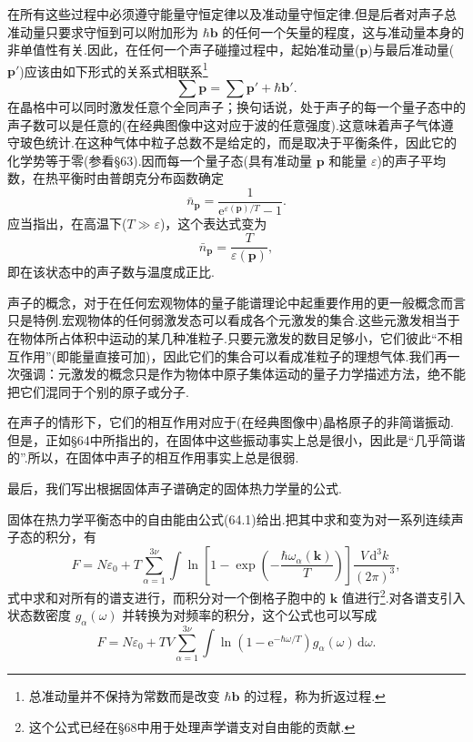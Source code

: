 在所有这些过程中必须遵守能量守恒定律以及准动量守恒定律.但是后者对声子总准动量只要求守恒到可以附加形为 $\hbar\boldsymbol{b}$ 的任何一个矢量的程度，这与准动量本身的非单值性有关.因此，在任何一个声子碰撞过程中，起始准动量($\boldsymbol{p}$)与最后准动量($\boldsymbol{p}'$)应该由如下形式的关系式相联系\footnote{总准动量并不保持为常数而是改变 $\hbar\boldsymbol{b}$ 的过程，称为折返过程.}
\begin{equation}
  \sum\boldsymbol{p}=\sum\boldsymbol{p}'+\hbar\boldsymbol{b}'.
\end{equation}
在晶格中可以同时激发任意个全同声子；换句话说，处于声子的每一个量子态中的声子数可以是任意的(在经典图像中这对应于波的任意强度).这意味着声子气体遵守玻色统计.在这种气体中粒子总数不是给定的，而是取决于平衡条件，因此它的化学势等于零(参看§63).因而每一个量子态(具有准动量 $\boldsymbol{p}$ 和能量 $\varepsilon$)的声子平均数，在热平衡时由普朗克分布函数确定
\begin{equation}
  \bar{n}_{\boldsymbol{p}}=\frac{1}{\mathrm{e}^{\varepsilon(\boldsymbol{p})/T}-1}.
\end{equation}
应当指出，在高温下($T\gg\varepsilon$)，这个表达式变为
\begin{equation}
  \bar{n}_{\boldsymbol{p}}=\frac{T}{\varepsilon(\boldsymbol{p})},
\end{equation}
即在该状态中的声子数与温度成正比.

声子的概念，对于在任何宏观物体的量子能谱理论中起重要作用的更一般概念而言只是特例.宏观物体的任何弱激发态可以看成各个元激发的集合.这些元激发相当于在物体所占体积中运动的某几种准粒子.只要元激发的数目足够小，它们彼此“不相互作用”(即能量直接可加)，因此它们的集合可以看成准粒子的理想气体.我们再一次强调：元激发的概念只是作为物体中原子集体运动的量子力学描述方法，绝不能把它们混同于个别的原子或分子.

在声子的情形下，它们的相互作用对应于(在经典图像中)晶格原子的非简谐振动.但是，正如§64中所指出的，在固体中这些振动事实上总是很小，因此是“几乎简谐的”.所以，在固体中声子的相互作用事实上总是很弱.

最后，我们写出根据固体声子谱确定的固体热力学量的公式.

固体在热力学平衡态中的自由能由公式(64.1)给出.把其中求和变为对一系列连续声子态的积分，有
\begin{equation}
  F=N\varepsilon_0+T\sum_{\alpha=1}^{3\nu}\int\ln\left[1-\exp\left(-\frac{\hbar\omega_\alpha(\boldsymbol{k})}{T}\right)\right]\frac{V\,\mathrm{d}^3k}{(2\pi)^3},
\end{equation}
式中求和对所有的谱支进行，而积分对一个倒格子胞中的 $\boldsymbol{k}$ 值进行\footnote{这个公式已经在§68中用于处理声学谱支对自由能的贡献.}.对各谱支引入状态数密度 $g_\alpha(\omega)$ 并转换为对频率的积分，这个公式也可以写成
\begin{equation}
  F=N\varepsilon_0+TV\sum_{\alpha=1}^{3\nu}\int\ln\left(1-\mathrm{e}^{-\hbar\omega/T}\right)g_\alpha(\omega)\,\mathrm{d}\omega.
\end{equation}

